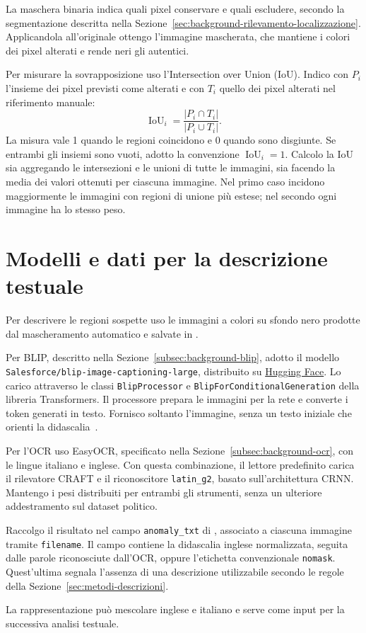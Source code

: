 La maschera binaria indica quali pixel conservare e quali escludere, secondo la segmentazione descritta nella Sezione~\ref{sec:background-rilevamento-localizzazione}. Applicandola all’originale ottengo l’immagine mascherata, che mantiene i colori dei pixel alterati e rende neri gli autentici.

Per misurare la sovrapposizione uso l'Intersection over Union (IoU). Indico con $P_i$ l'insieme dei pixel previsti come alterati e con $T_i$ quello dei pixel alterati nel riferimento manuale:
\begin{equation}
    \operatorname{IoU}_i=\frac{|P_i\cap T_i|}{|P_i\cup T_i|}.
    \label{eq:maschere-iou}
\end{equation}
La misura vale 1 quando le regioni coincidono e 0 quando sono disgiunte. Se entrambi gli insiemi sono vuoti, adotto la convenzione $\operatorname{IoU}_i=1$. Calcolo la IoU sia aggregando le intersezioni e le unioni di tutte le immagini, sia facendo la media dei valori ottenuti per ciascuna immagine. Nel primo caso incidono maggiormente le immagini con regioni di unione più estese; nel secondo ogni immagine ha lo stesso peso.

\section{Modelli e dati per la descrizione testuale}
\label{sec:materiali-descrizioni}

Per descrivere le regioni sospette uso le immagini a colori su sfondo nero prodotte dal mascheramento automatico e salvate in .

Per BLIP, descritto nella Sezione~\ref{subsec:background-blip}, adotto il modello \texttt{Salesforce/blip-image-captioning-large}, distribuito su \href{https://huggingface.co/Salesforce/blip-image-captioning-large}{Hugging Face}. Lo carico attraverso le classi \texttt{BlipProcessor} e \texttt{BlipForConditionalGeneration} della libreria Transformers. Il processore prepara le immagini per la rete e converte i token generati in testo. Fornisco soltanto l'immagine, senza un testo iniziale che orienti la didascalia~\cite{wolf-etal-2020-transformers}.

Per l'OCR uso EasyOCR, specificato nella Sezione~\ref{subsec:background-ocr}, con le lingue italiano e inglese. Con questa combinazione, il lettore predefinito carica il rilevatore CRAFT e il riconoscitore \texttt{latin\_g2}, basato sull'architettura CRNN. Mantengo i pesi distribuiti per entrambi gli strumenti, senza un ulteriore addestramento sul dataset politico.

Raccolgo il risultato nel campo \texttt{anomaly\_txt} di , associato a ciascuna immagine tramite \texttt{filename}. Il campo contiene la didascalia inglese normalizzata, seguita dalle parole riconosciute dall'OCR, oppure l'etichetta convenzionale \texttt{nomask}. Quest'ultima segnala l'assenza di una descrizione utilizzabile secondo le regole della Sezione~\ref{sec:metodi-descrizioni}.

La rappresentazione può mescolare inglese e italiano e serve come input per la successiva analisi testuale.
